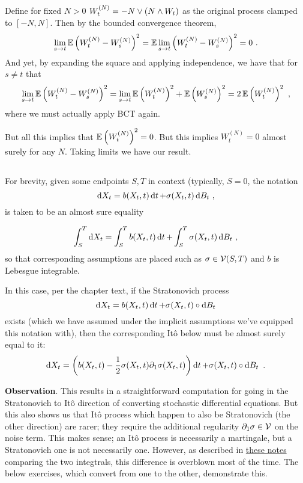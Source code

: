 \documentclass{article}
\begin{document}
  Define for fixed \(N>0\) \(W_t^{(N)}=-N\lor \left({N\land W_t}\right)\) as the original process clamped to \([-N,N]\). Then by the bounded convergence theorem,
  \[
    \lim_{s\rightarrow t}\operatorname{\mathbb{E}}\left({ W_t^{(N)}-W_s^{(N)}}\right)^2    =\operatorname{\mathbb{E}}\lim_{s\rightarrow t}\left({ W_t^{(N)}-W_s^{(N)}}\right)^2=0\,\,.
    \]
    And yet, by expanding the square and applying independence, we have that for \(s\neq t\) that
    \[
          \lim_{s\rightarrow t}\operatorname{\mathbb{E}}\left({ W_t^{(N)}-W_s^{(N)}}\right)^2    =\lim_{s\rightarrow t}\operatorname{\mathbb{E}}\left({W_t^{(N)}}\right)^2+\operatorname{\mathbb{E}}\left({W_s^{(N)}}\right)^2=2\operatorname{\mathbb{E}}\left({W_t^{(N)}}\right)^2\,\,,
        \]
        where we must actually apply BCT again.

        But all this implies that \(\operatorname{\mathbb{E}}\left({W_t^{(N)}}\right)^2=0\). But this implies \(W_t^{(N)}=0\) almost surely for any \(N\). Taking limits we have our result.

        \subsection{}

        For brevity, given some endpoints \(S,T\) in context (typically, \(S=0\), the notation
        \[
          \mathop{\mathrm{d} X_t }=b(X_t,t)\mathop{\mathrm{d} t }+\sigma(X_t,t)\mathop{\mathrm{d} B_t }\,\,,
        \]
        is taken to be an almost sure equality
        
        \[
          \int_S^T\mathop{\mathrm{d} X_t }=\int_S^Tb(X_t,t)\mathop{\mathrm{d} t }+\int_S^T\sigma(X_t,t)\mathop{\mathrm{d} B_t }\,\,,
        \]
        so that corresponding assumptions are placed such as \(\sigma\in\mathcal{V}(S, T)\) and \(b\) is Lebesgue integrable.

        In this case, per the chapter text, if the Stratonovich process
        \[
          \mathop{\mathrm{d} X_t }=b(X_t,t)\mathop{\mathrm{d} t }+\sigma(X_t, t)\circ\mathop{\mathrm{d} B_t }
        \]
        exists (which we have assumed under the implicit assumptions we've equipped this notation with), then the corresponding It\^{o} below must be almost surely equal to it:
        \[
          \mathop{\mathrm{d} X_t }=\left({b(X_t,t)-\frac{1}{2}\sigma(X_t,t)\partial_1\sigma(X_t, t)}\right)\mathop{\mathrm{d} t }+\sigma(X_t, t)\circ\mathop{\mathrm{d} B_t }\,\,.
        \]

        \textbf{Observation}. This results in a straightforward computation for going in the Stratonovich to It\^{o} direction of converting stochastic differential equations. But this also shows us that It\^{o} process which happen to also be Stratonovich (the other direction) are rarer; they require the additional regularity \(\partial_1\sigma\in\mathcal{V}\) on the noise term. This makes sense; an It\^{o} process is necessarily a martingale, but a Stratonovich one is not necessarily one. However, as described in \href{https://www.robots.ox.ac.uk/~lsgs/resources/ito-strat.pdf}{these notes} comparing the two integtrals, this difference is overblown most of the time. The below exercises, which convert from one to the other, demonstrate this.
\end{document}
